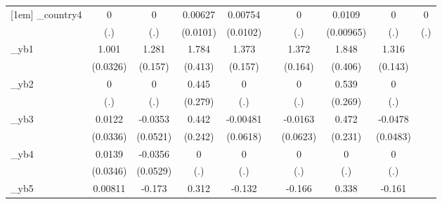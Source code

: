 \begin{table}[htbp]
\begin{tabular}{l*{9}{c}}
[1em]
\_country4   &           0         &           0         &     0.00627         &     0.00754         &                     &           0         &      0.0109         &           0         &           0         \\
            &         (.)         &         (.)         &    (0.0101)         &    (0.0102)         &                     &         (.)         &   (0.00965)         &         (.)         &         (.)         \\
[1em]
\_yb1        &       1.001\sym{***}&       1.281\sym{***}&       1.784\sym{***}&       1.373\sym{***}&                     &       1.372\sym{***}&       1.848\sym{***}&       1.316\sym{***}&                     \\
            &    (0.0326)         &     (0.157)         &     (0.413)         &     (0.157)         &                     &     (0.164)         &     (0.406)         &     (0.143)         &                     \\
[1em]
\_yb2        &           0         &           0         &       0.445         &           0         &                     &           0         &       0.539\sym{**} &           0         &                     \\
            &         (.)         &         (.)         &     (0.279)         &         (.)         &                     &         (.)         &     (0.269)         &         (.)         &                     \\
[1em]
\_yb3        &      0.0122         &     -0.0353         &       0.442\sym{*}  &    -0.00481         &                     &     -0.0163         &       0.472\sym{**} &     -0.0478         &                     \\
            &    (0.0336)         &    (0.0521)         &     (0.242)         &    (0.0618)         &                     &    (0.0623)         &     (0.231)         &    (0.0483)         &                     \\
[1em]
\_yb4        &      0.0139         &     -0.0356         &           0         &           0         &                     &           0         &           0         &           0         &                     \\
            &    (0.0346)         &    (0.0529)         &         (.)         &         (.)         &                     &         (.)         &         (.)         &         (.)         &                     \\
[1em]
\_yb5        &     0.00811         &      -0.173         &       0.312\sym{*}  &      -0.132         &                     &      -0.166         &       0.338\sym{*}  &      -0.161         &                     \\

\end{tabular}
\end{table}
